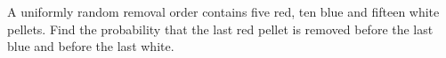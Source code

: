 A uniformly random removal order contains five red, ten blue and fifteen white pellets. Find the probability that the last red pellet is removed before the last blue and before the last white.
